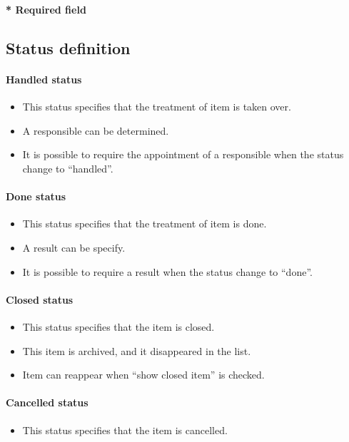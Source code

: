 \documentclass[letterpaper,10pt,english]{sphinxmanual}
\begin{document}
\textbf{* Required field}
\newpage

\subsection{Status definition}
\label{ListsOfValues:status-definition}\paragraph{Handled status}
\begin{itemize}
\item {} 
This status specifies that the treatment of item is taken over.

\item {} 
A responsible can be determined.

\item {} 
It is possible to require the appointment of a responsible when the status change to ``handled''.

\end{itemize}
\paragraph{Done status}
\begin{itemize}
\item {} 
This status specifies that the treatment of item is done.

\item {} 
A result can be specify.

\item {} 
It is possible to require a result when the status change to ``done''.

\end{itemize}
\paragraph{Closed status}
\begin{itemize}
\item {} 
This status specifies that the item is closed.

\item {} 
This item is archived, and it disappeared in the list.

\item {} 
Item can reappear when ``show closed item'' is checked.

\end{itemize}
\paragraph{Cancelled status}
\begin{itemize}
\item {} 
This status specifies that the item is cancelled.

\end{itemize}
\newpage
{}
\end{document}

